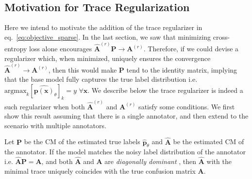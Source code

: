 \clearpage
\subsection{Motivation for Trace Regularization}\label{sec:theorems}
Here we intend to motivate the addition of the trace regularizer in eq.~\ref{eq:objective_sparse}. In the last section, we saw that minimizing cross-entropy loss alone encourages $\hat{\textbf{A}}^{(r)}\textbf{P}\rightarrow \textbf{A}^{(r)}$. Therefore, if we could devise a regularizer which, when minimized, uniquely ensures the convergence $\hat{\textbf{A}}^{(r)}\rightarrow\textbf{A}^{(r)}$, then this would make $\textbf{P}$ tend to the identity matrix, implying that the base model fully captures the true label distribution i.e. $\text{argmax}_{k}[\hat{\textbf{p}(\mathbf{x})}_{\theta}]_{k} =  y\,\, \forall \mathbf{x}$. We describe below the trace regularizer is indeed a such regularizer when both $\hat{\mathbf{A}}^{(r)}$ and $\mathbf{A}^{(r)}$ satisfy some conditions. We first show this result assuming that there is a single annotator, and then extend to the scenario with multiple annotators.  

\begin{lemma}
\label{lemma:1}
Let $\textbf{P}$ be the CM of the estimated true labels $\hat{\textbf{p}}_{\theta}$ and $\hat{\textbf{A}}$ be the estimated CM of the annotator. If the model matches the noisy label distribution of the annotator i.e. $\hat{\textbf{A}}\textbf{P}=\textbf{A} $, and both $\hat{\textbf{A}}$ and $\textbf{A}$ are \textit{diagonally dominant} , then $\hat{\textbf{A}}$ with the minimal trace uniquely coincides with the true confusion matrix $\textbf{A}$. %
\end{lemma}


